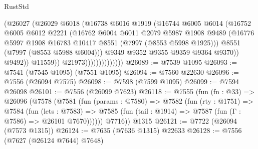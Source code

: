 \begin{lexlean}{RustStd}
\begin{coremodule}
                                  (@26027
                                    (@26029
                                      @6018
                                      (@16738
                                        @6016
                                        @1919
                                        (@16744
                                          @6005
                                          @6014
                                          (@16752
                                            @6005
                                            @6012
                                            @2221
                                            (@16762
                                              @6004
                                              @6011
                                              @2079
                                              @5987
                                              @1908
                                              @9489
                                              (@16776
                                                @5997
                                                @1908
                                                @16783
                                                @10417
                                                @8551
                                                (@7997 (@8553 @5998 @1925)))
                                              @8551
                                              (@7997 (@8553 @5988 @6004)))
                                            @9349
                                            @9352
                                            @9355
                                            @9359
                                            @9364
                                            @9370))
                                        @9492))
                                    @11559))
                                @21973))))))))))))))
@26089 := @7539 @1095
@26093 := @7541 (@7545 @1095) (@7551 @1095)
@26094 := @7560 @22630
@26096 := @7556 (@26094 @7575)
@26098 := @7598 (@7599 @1095)
@26099 := @7594 @26098
@26101 := @7556 (@26099 @7623)
@26118 := @7555
    (fun (fn : @33) =>
    @26096
      (@7578
        (@7581
          (fun (params : @7580) =>
          @7582
            (fun (rty : @1751) =>
            @7584
              (fun (lets : @7583) =>
              @7585 (fun (tail : @1914) => @7587 (fun (Γ : @7586) => @26101 @7670))))))
        @7716))
    @1315
@26121 := @7722 (@26094 (@7573 @1315))
@26124 := @7635 (@7636 @1315) @22633
@26128 := @7556 (@7627 (@26124 @7644) @7648)

\end{coremodule}
\end{lexlean}
